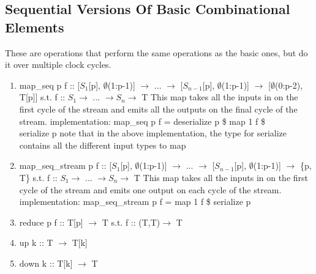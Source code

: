 \documentclass[11pt,fleqn]{article}
\numberwithin{equation}{subsection}
\begin{document}
\subsection{Sequential Versions Of Basic Combinational Elements}
These are operations that perform the same operations as the basic ones, but
do it over multiple clock cycles.
\begin{enumerate}
    \item map\_seq p f :: [$S_1$[p], $\emptyset$(1:p-1)] $\rightarrow$ ...
        $\rightarrow$ [$S_{n-1}$[p], $\emptyset$(1:p-1)] $\rightarrow$
        [$\emptyset$(0:p-2), T[p]]
        \subitem s.t. f :: $S_1 \rightarrow$ ... $\rightarrow S_n \rightarrow$ T
        \subitem This map takes all the inputs in on the first cycle of the 
        stream and emits all the outputs on the final cycle of the stream.
        \subitem implementation: map\_seq p f = deserialize p \$ map 1 f \$ \\ serialize p
        \subitem note that in the above implementation, the type for serialize 
        contains all the different input types to map
    \item map\_seq\_stream p f :: [$S_1$[p], $\emptyset$(1:p-1)] $\rightarrow$ ...
        $\rightarrow$ [$S_{n-1}$[p], $\emptyset$(1:p-1)] $\rightarrow$
        \{p, T\}
        \subitem s.t. f :: $S_1 \rightarrow$ ... $\rightarrow S_n \rightarrow$ T
        \subitem This map takes all the inputs in on the first cycle of the 
        stream and emits one output on each cycle of the stream.
        \subitem implementation: map\_seq\_stream p f = map 1 f \$ serialize p
    \item reduce p f :: T[p] $\rightarrow$ T
        \subitem s.t. f :: (T,T)$\rightarrow$ T
    \item up k :: T $\rightarrow$ T[k]
    \item down k :: T[k] $\rightarrow$ T
\end{enumerate}
\end{document}
